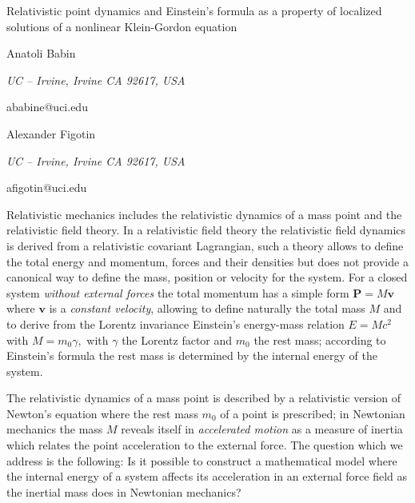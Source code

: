 \documentclass[10pt,a4paper]{article}
\begin{document}
\begin{center}
{\large Relativistic point dynamics and Einstein's formula as a property of localized solutions of a nonlinear Klein-Gordon equation}

\smallskip

{\sc Anatoli Babin}

{\small\it UC -- Irvine, Irvine CA 92617, USA}

{\small\rm ababine@uci.edu}

\smallskip

{\sc Alexander Figotin}

{\small\it UC -- Irvine, Irvine CA 92617, USA}

{\small\rm afigotin@uci.edu}
\end{center}


Relativistic mechanics includes the relativistic dynamics of a mass point
and the relativistic field theory. In a relativistic field theory the
relativistic field dynamics is derived from a relativistic covariant
Lagrangian, such a theory allows to define the total energy and momentum,
forces and their densities but does not provide a canonical way to define
the mass, position or velocity for the system. For a closed system \emph{%
without external forces} the total momentum has a simple form $\mathbf{P}=M%
\mathbf{v}$ where $\mathbf{v}$ is a \emph{constant velocity}, allowing to
define naturally the total mass $M$ and to derive from the Lorentz
invariance Einstein's energy-mass relation $E=Mc^{2}$ with $M=m_{0}\gamma ,$
with $\gamma $ the Lorentz factor and $m_{0}$ the rest mass;
according to Einstein's formula the rest mass is determined by the internal
energy of the system.

The relativistic dynamics of a mass point is described by a relativistic
version of Newton's equation where the rest mass $m_{0}$ of a point is
prescribed; in Newtonian mechanics the mass $M$ reveals itself in \emph{%
accelerated motion} as a measure of inertia which relates the point
acceleration to the external force. The question which we address is the
following: Is it possible to construct a mathematical model where the
internal energy of a system affects its acceleration in an external force
field as the inertial mass does in Newtonian mechanics? 
\end{document}
